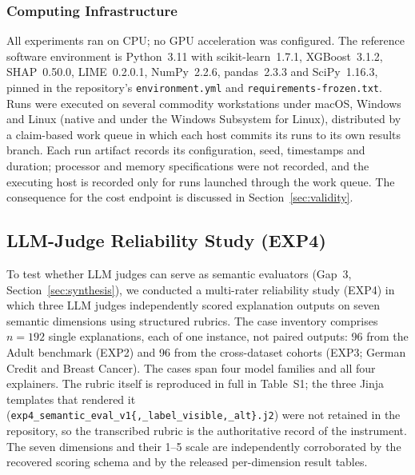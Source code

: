 \documentclass[10pt,a4paper,twoside]{article}
\begin{document}
\subsubsection{Computing Infrastructure}
\label{sec:infrastructure}

All experiments ran on CPU; no GPU acceleration was configured. The
reference software environment is Python~3.11 with scikit-learn~1.7.1,
XGBoost~3.1.2, SHAP~0.50.0, LIME~0.2.0.1, NumPy~2.2.6, pandas~2.3.3 and
SciPy~1.16.3, pinned in the repository's \texttt{environment.yml} and
\texttt{requirements-frozen.txt}. Runs were executed on several commodity
workstations under macOS, Windows and Linux (native and under the Windows
Subsystem for Linux), distributed by a claim-based work queue in which each
host commits its runs to its own results branch. Each run artifact records
its configuration, seed, timestamps and duration; processor and memory
specifications were not recorded, and the executing host is recorded only for
runs launched through the work queue. The consequence for the cost endpoint
is discussed in Section~\ref{sec:validity}.

\subsection{LLM-Judge Reliability Study (EXP4)}
\label{sec:exp4_methods}

To test whether LLM judges can serve as semantic evaluators (Gap~3,
Section~\ref{sec:synthesis}), we conducted a multi-rater reliability
study (EXP4) in which three LLM judges independently scored explanation
outputs on seven semantic dimensions using structured rubrics. The case
inventory comprises $n=192$ single explanations, each of one instance, not
paired outputs: 96 from the Adult benchmark (EXP2) and 96 from the
cross-dataset cohorts (EXP3; German Credit and Breast Cancer). The cases span
four model families and all four explainers.
The rubric itself is reproduced in full in Table~S1; the three
Jinja templates that rendered it
(\texttt{exp4\_semantic\_eval\_v1\{,\_label\_visible,\_alt\}.j2}) were not
retained in the repository, so the transcribed rubric is the authoritative
record of the instrument. The seven dimensions and their 1--5 scale are
independently corroborated by the recovered scoring schema and by the released
per-dimension result tables.
\end{document}
